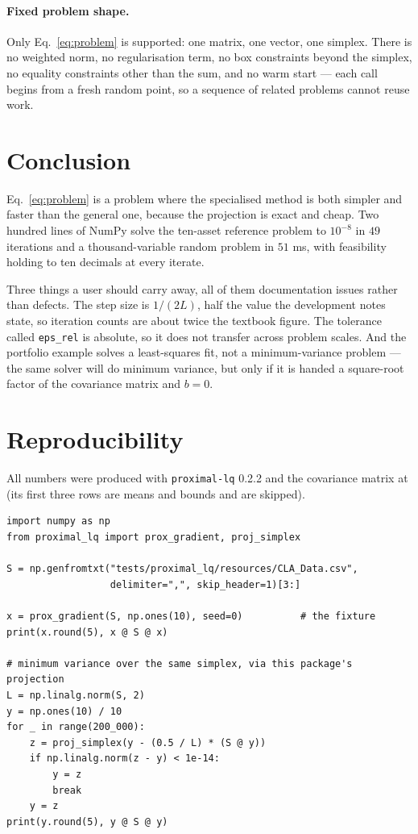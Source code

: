 \documentclass[11pt,a4paper]{article}
\newcommand{\code}[1]{\texttt{#1}}
\begin{document}
\paragraph{Fixed problem shape.} Only Eq.~\eqref{eq:problem} is supported: one
matrix, one vector, one simplex. There is no weighted norm, no regularisation
term, no box constraints beyond the simplex, no equality constraints other than
the sum, and no warm start --- each call begins from a fresh random point, so a
sequence of related problems cannot reuse work.

\section{Conclusion}

Eq.~\eqref{eq:problem} is a problem where the specialised method is both simpler
and faster than the general one, because the projection is exact and cheap. Two
hundred lines of NumPy solve the ten-asset reference problem to $10^{-8}$ in $49$
iterations and a thousand-variable random problem in $51$ ms, with feasibility
holding to ten decimals at every iterate.

Three things a user should carry away, all of them documentation issues rather
than defects. The step size is $1/(2L)$, half the value the development notes
state, so iteration counts are about twice the textbook figure. The tolerance
called \code{eps\_rel} is absolute, so it does not transfer across problem
scales. And the portfolio example solves a least-squares fit, not a
minimum-variance problem --- the same solver will do minimum variance, but only
if it is handed a square-root factor of the covariance matrix and $b=0$.

\appendix

\section{Reproducibility}
\label{app:repro}

All numbers were produced with \code{proximal-lq} 0.2.2 and the covariance
matrix at  (its first three
rows are means and bounds and are skipped).

\begin{verbatim}
import numpy as np
from proximal_lq import prox_gradient, proj_simplex

S = np.genfromtxt("tests/proximal_lq/resources/CLA_Data.csv",
                  delimiter=",", skip_header=1)[3:]

x = prox_gradient(S, np.ones(10), seed=0)          # the fixture
print(x.round(5), x @ S @ x)

# minimum variance over the same simplex, via this package's projection
L = np.linalg.norm(S, 2)
y = np.ones(10) / 10
for _ in range(200_000):
    z = proj_simplex(y - (0.5 / L) * (S @ y))
    if np.linalg.norm(z - y) < 1e-14:
        y = z
        break
    y = z
print(y.round(5), y @ S @ y)
\end{verbatim}
\end{document}

